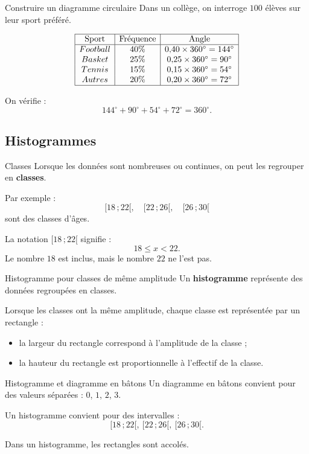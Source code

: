 \documentclass[11pt,a4paper]{article}
\newcommand{\intervalle}[2]{\ensuremath{[#1\,;#2[}}
\begin{document}
\begin{examplebox}{Construire un diagramme circulaire}
Dans un collège, on interroge $100$ élèves sur leur sport préféré.

\[
\begin{array}{|c|c|c|}
\hline
\text{Sport} & \text{Fréquence} & \text{Angle} \\
\hline
Football & 40\% & 0{,}40\times 360^\circ=144^\circ \\
Basket & 25\% & 0{,}25\times 360^\circ=90^\circ \\
Tennis & 15\% & 0{,}15\times 360^\circ=54^\circ \\
Autres & 20\% & 0{,}20\times 360^\circ=72^\circ \\
\hline
\end{array}
\]

On vérifie :
\[
144^\circ+90^\circ+54^\circ+72^\circ=360^\circ.
\]
\end{examplebox}

\subsection{Histogrammes}

\begin{definitionbox}{Classes}
Lorsque les données sont nombreuses ou continues, on peut les regrouper en \textbf{classes}.

Par exemple :
\[
\intervalle{18}{22},\quad \intervalle{22}{26},\quad \intervalle{26}{30}
\]
sont des classes d'âges.

La notation $\intervalle{18}{22}$ signifie :
\[
18 \leq x < 22.
\]
Le nombre $18$ est inclus, mais le nombre $22$ ne l'est pas.
\end{definitionbox}

\begin{definitionbox}{Histogramme pour classes de même amplitude}
Un \textbf{histogramme} représente des données regroupées en classes.

Lorsque les classes ont la même amplitude, chaque classe est représentée par un rectangle :
\begin{itemize}
    \item la largeur du rectangle correspond à l'amplitude de la classe ;
    \item la hauteur du rectangle est proportionnelle à l'effectif de la classe.
\end{itemize}
\end{definitionbox}

\begin{warningbox}{Histogramme et diagramme en bâtons}
Un diagramme en bâtons convient pour des valeurs séparées : $0$, $1$, $2$, $3$.

Un histogramme convient pour des intervalles :
\[
\intervalle{18}{22},\ \intervalle{22}{26},\ \intervalle{26}{30}.
\]

Dans un histogramme, les rectangles sont accolés.
\end{warningbox}
\end{document}
